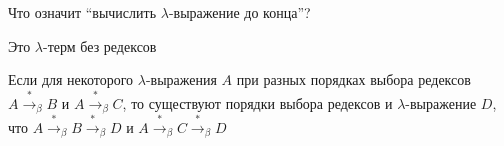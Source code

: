 \begin{frame}{Что означит \enquote{вычислить $\lambda$-выражение до конца}?}

\def\into{\ensuremath{\xrightarrow{\ *\ }_{\beta}}}
\vspace{-0.5em}
\begin{definition}
Это $\lambda$-терм без редексов
\end{definition}

\begin{theorem}
Если для некоторого $\lambda$-выражения $A$ при разных порядках выбора редексов
$A \into B$ и $A \into C$,
то существуют порядки выбора редексов и $\lambda$-выражение $D$, что $A\into B \into D$ и $A\into C \into D$
\end{theorem}
\end{frame}

